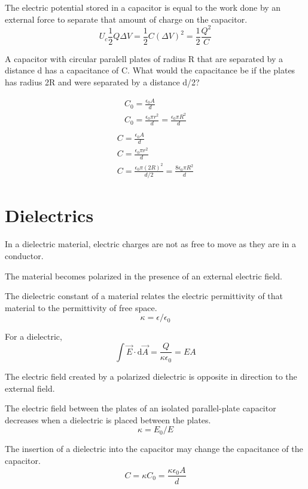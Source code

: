 \documentclass[../em.tex]{subfiles}
\begin{document}
The electric potential stored in a capacitor is equal to the work done by an external force 
to separate that amount of charge on the capacitor.
\[U_c \frac{1}{2}Q\Delta V = \frac{1}{2}C(\Delta V)^2 = \frac{1}{2}\frac{Q^2}{C}\]

\begin{example}
    A capacitor with circular paralell plates of radius R that are separated by a distance d 
    has a capacitance of C. What would the capacitance be if the plates has radius 2R and 
    were separated by a distance d/2?

    \begin{align*}
        C_0 = \frac{\epsilon_0 A}{d}\\ 
        C_0 = \frac{\epsilon_0\pi r^2}{d}=\frac{\epsilon_0 \pi R^2}{d}\\
    \end{align*}
    \begin{align*}
        C = \frac{\epsilon_0 A}{d}\\
        C = \frac{\epsilon_0 \pi r^2}{d}\\
        C = \frac{\epsilon_0 \pi (2R)^2}{d/2} = \frac{8\epsilon_0\pi R^2}{d}
    \end{align*}
\end{example}


\section{Dielectrics}
In a dielectric material, electric charges are not as free to move as they are in a conductor.

The material becomes polarized in the presence of an external electric field.

The dielectric constant of a material relates the electric permittivity of that material to the permittivity of free space.
\[\kappa = \epsilon/\epsilon_0\]

For a dielectric, 
\[\int \vec{E}\cdot \mathrm{d}\vec{A} = \frac{Q}{\kappa \epsilon_0}=EA \]

The electric field created by a polarized dielectric is opposite in direction to the external field.

The electric field between the plates of an isolated parallel-plate capacitor decreases when a 
dielectric is placed between the plates.
\[\kappa = E_0/E\]

The insertion of a dielectric into the capacitor may change the capacitance of the capacitor.
\[C = \kappa C_0 = \frac{\kappa \epsilon_0 A}{d}\]
\end{document}
